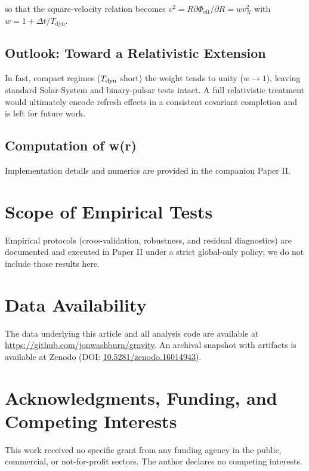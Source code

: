 \documentclass[usenatbib]{mnras}
\begin{document}
so that the square-velocity relation becomes $v^2 = R \partial\Phi_{\text{eff}}/\partial R = w v_N^2$ with $w = 1 + \Delta t/T_{\text{dyn}}$.

\subsection{Outlook: Toward a Relativistic Extension}

In fast, compact regimes ($T_{\rm dyn}$ short) the weight tends to unity ($w\to 1$), leaving standard Solar-System and binary-pulsar tests intact. A full relativistic treatment would ultimately encode refresh effects in a consistent covariant completion and is left for future work.

\subsection{Computation of w(r)}

Implementation details and numerics are provided in the companion Paper II.

\section{Scope of Empirical Tests}
Empirical protocols (cross-validation, robustness, and residual diagnostics) are documented and executed in Paper II under a strict global-only policy; we do not include those results here.

\section*{Data Availability}

The data underlying this article and all analysis code are available at \href{https://github.com/jonwashburn/gravity}{https://github.com/jonwashburn/gravity}. An archival snapshot with artifacts is available at Zenodo (DOI: \href{https://doi.org/10.5281/zenodo.16014943}{10.5281/zenodo.16014943}).

\section*{Acknowledgments, Funding, and Competing Interests}

This work received no specific grant from any funding agency in the public, commercial, or not-for-profit sectors. The author declares no competing interests.
\end{document}
